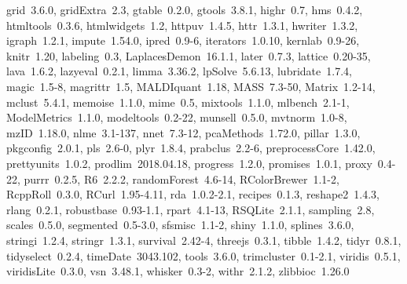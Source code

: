 \documentclass[12pt]{article}\usepackage[]{graphicx}\usepackage[]{color}
\begin{document}
\begin{appendices}
\begin{itemize}
    grid~3.6.0, gridExtra~2.3, gtable~0.2.0, gtools~3.8.1,
    highr~0.7, hms~0.4.2, htmltools~0.3.6, htmlwidgets~1.2,
    httpuv~1.4.5, httr~1.3.1, hwriter~1.3.2, igraph~1.2.1,
    impute~1.54.0, ipred~0.9-6, iterators~1.0.10, kernlab~0.9-26,
    knitr~1.20, labeling~0.3, LaplacesDemon~16.1.1, later~0.7.3,
    lattice~0.20-35, lava~1.6.2, lazyeval~0.2.1, limma~3.36.2,
    lpSolve~5.6.13, lubridate~1.7.4, magic~1.5-8, magrittr~1.5,
    MALDIquant~1.18, MASS~7.3-50, Matrix~1.2-14, mclust~5.4.1,
    memoise~1.1.0, mime~0.5, mixtools~1.1.0, mlbench~2.1-1,
    ModelMetrics~1.1.0, modeltools~0.2-22, munsell~0.5.0,
    mvtnorm~1.0-8, mzID~1.18.0, nlme~3.1-137, nnet~7.3-12,
    pcaMethods~1.72.0, pillar~1.3.0, pkgconfig~2.0.1, pls~2.6-0,
    plyr~1.8.4, prabclus~2.2-6, preprocessCore~1.42.0,
    prettyunits~1.0.2, prodlim~2018.04.18, progress~1.2.0,
    promises~1.0.1, proxy~0.4-22, purrr~0.2.5, R6~2.2.2,
    randomForest~4.6-14, RColorBrewer~1.1-2, RcppRoll~0.3.0,
    RCurl~1.95-4.11, rda~1.0.2-2.1, recipes~0.1.3, reshape2~1.4.3,
    rlang~0.2.1, robustbase~0.93-1.1, rpart~4.1-13, RSQLite~2.1.1,
    sampling~2.8, scales~0.5.0, segmented~0.5-3.0, sfsmisc~1.1-2,
    shiny~1.1.0, splines~3.6.0, stringi~1.2.4, stringr~1.3.1,
    survival~2.42-4, threejs~0.3.1, tibble~1.4.2, tidyr~0.8.1,
    tidyselect~0.2.4, timeDate~3043.102, tools~3.6.0,
    trimcluster~0.1-2.1, viridis~0.5.1, viridisLite~0.3.0,
    vsn~3.48.1, whisker~0.3-2, withr~2.1.2, zlibbioc~1.26.0
\end{itemize}


\end{appendices}



\end{document}
